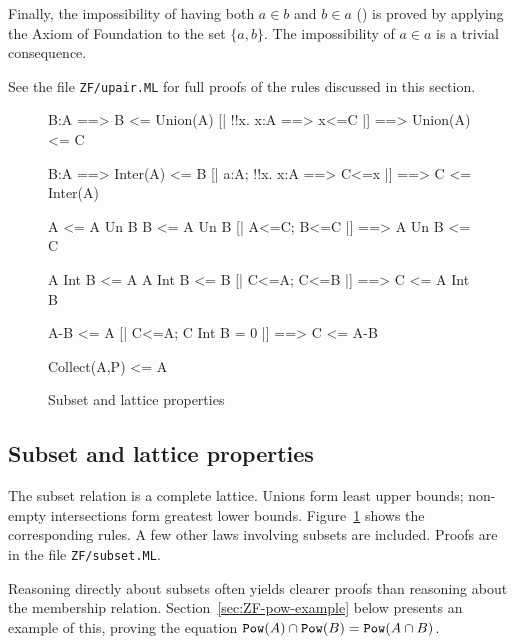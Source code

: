 Finally, the impossibility of having both $a\in b$ and $b\in a$
() is proved by applying the Axiom of Foundation to
the set $\{a,b\}$.  The impossibility of $a\in a$ is a trivial consequence.

See the file {\tt ZF/upair.ML} for full proofs of the rules discussed in
this section.



\begin{figure}
\begin{ttbox}
       B:A ==> B <= Union(A)
       [| !!x. x:A ==> x<=C |] ==> Union(A) <= C

       B:A ==> Inter(A) <= B
    [| a:A;  !!x. x:A ==> C<=x |] ==> C <= Inter(A)

         A <= A Un B
         B <= A Un B
          [| A<=C;  B<=C |] ==> A Un B <= C

        A Int B <= A
        A Int B <= B
      [| C<=A;  C<=B |] ==> C <= A Int B

       A-B <= A
     [| C<=A;  C Int B = 0 |] ==> C <= A-B

    Collect(A,P) <= A
\end{ttbox}
\caption{Subset and lattice properties} \label{zf-subset}
\end{figure}


\subsection{Subset and lattice properties}
The subset relation is a complete lattice.  Unions form least upper bounds;
non-empty intersections form greatest lower bounds.  Figure~\ref{zf-subset}
shows the corresponding rules.  A few other laws involving subsets are
included.  Proofs are in the file {\tt ZF/subset.ML}.

Reasoning directly about subsets often yields clearer proofs than
reasoning about the membership relation.  Section~\ref{sec:ZF-pow-example}
below presents an example of this, proving the equation ${{\tt Pow}(A)\cap
  {\tt Pow}(B)}= {\tt Pow}(A\cap B)$.


